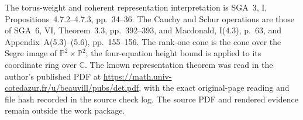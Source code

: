 The torus-weight and coherent representation interpretation
is SGA~3, I, Propositions~4.7.2--4.7.3, pp.~34--36.
The Cauchy and Schur operations are those of
SGA~6, VI, Theorem~3.3, pp.~392--393, and Macdonald,
I(4.3), p.~63, and Appendix~A(5.3)--(5.6), pp.~155--156.
The rank-one cone is the cone over the Segre image of
\(\mathbb P^2\times\mathbb P^2\); the four-equation
height bound is applied to its coordinate ring over
\(\mathbb C\).
The known representation theorem was read in the author's
published PDF at
\url{https://math.univ-cotedazur.fr/u/beauvill/pubs/det.pdf},
with the exact original-page reading and file hash
recorded in the source check log. The source PDF and
rendered evidence remain outside the work package.

